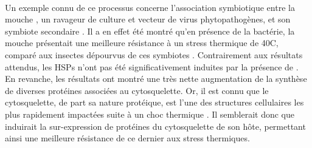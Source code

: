 

\paragraph*{}
Un exemple connu de ce processus concerne l'association symbiotique entre la mouche , un ravageur de culture et vecteur de virus phytopathogènes, et son symbiote secondaire .
Il a en effet été montré qu'en présence de la bactérie, la mouche présentait une meilleure résistance à un stress thermique de 40\textdegree{}C, comparé aux insectes dépourvus de ces symbiotes \cite{brumin2011}.
Contrairement aux résultats attendus, les HSPs n'ont pas été significativement induites par la présence de .
En revanche, les résultats ont montré une très nette augmentation de la synthèse de diverses protéines associées au cytosquelette.
Or, il est connu que le cytosquelette, de part sa nature protéique, est l'une des structures cellulaires les plus rapidement impactées suite à un choc thermique \cite{brumin2011}.
Il semblerait donc que  induirait la sur-expression de protéines du cytosquelette de son hôte, permettant ainsi une meilleure résistance de ce dernier aux stress thermiques.

